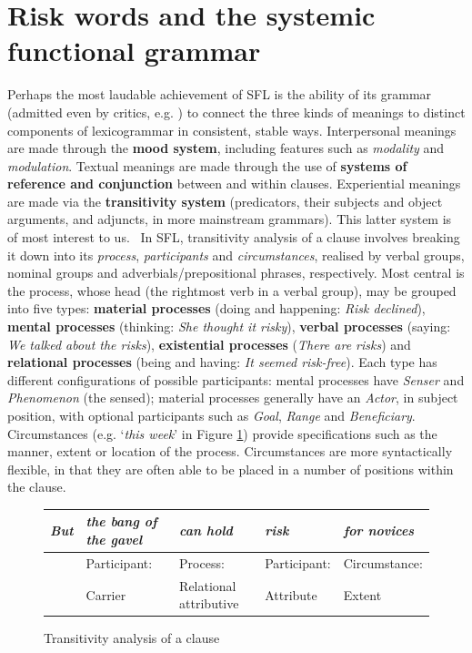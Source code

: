 	\section{Risk words and the systemic functional grammar}

		Perhaps the most laudable achievement of SFL is the ability of its grammar (admitted even by critics, e.g. ) to connect the three kinds of meanings to distinct components of lexicogrammar in consistent, stable ways. Interpersonal meanings are made through the \textbf{mood system}, including features such as \emph{modality} and \emph{modulation}. Textual meanings are made through the use of \textbf{systems of reference and conjunction} between and within clauses. Experiential meanings are made via the \textbf{transitivity system} (predicators, their subjects and object arguments, and adjuncts, in more mainstream grammars). This latter system is of most interest to us.~
		In SFL, transitivity analysis of a clause involves breaking it down into its \emph{process}, \emph{participants} and \emph{circumstances}, realised by verbal groups, nominal groups and adverbials/prepositional phrases, respectively. Most central is the process, whose head (the rightmost verb in a verbal group), may be grouped into five types: \textbf{material processes} (doing and happening: \emph{Risk declined}), \textbf{mental processes} (thinking: \emph{She thought it risky}), \textbf{verbal processes} (saying: \emph{We talked about the risks}), \textbf{existential processes} (\emph{There are risks}) and \textbf{relational processes} (being and having: \emph{It seemed risk-free}). Each type has different configurations of possible participants: mental processes have \emph{Senser} and \emph{Phenomenon} (the sensed); material processes generally have an \emph{Actor}, in subject position, with optional participants such as \emph{Goal}, \emph{Range} and \emph{Beneficiary}. Circumstances (e.g. `\emph{this week}' in Figure \ref{fig:transannotation}) provide specifications such as the manner, extent or location of the process. Circumstances are more syntactically flexible, in that they are often able to be placed in a number of positions within the clause.

			\begin{figure}[htb]
			\centering \small \onehalfspacing
    			\begin{tabularx}{0.75\textwidth}{|l|l|X|X|X|}
    			\hline
    			\emph{But}     & \emph{the bang of the gavel}             & \emph{can hold}          & \emph{risk} & \emph{for novices}          \\ \hline
    			~ & Participant: & Process: & Participant: & Circumstance:  \\
    			    			~ & Carrier & Relational \mbox{attributive} & Attribute &  Extent \\ \hline
    			\end{tabularx}
			\caption{Transitivity analysis of a clause}
			    			\label{fig:transannotation}
			\end{figure}

